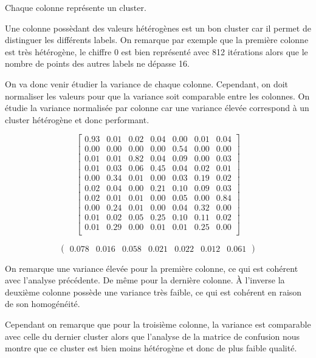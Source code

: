 \documentclass[french,a4paper,18pt]{article}
\begin{document}
Chaque colonne représente un cluster.

Une colonne possèdant des valeurs hétérogènes est un bon cluster car il permet de distinguer les différents labels.
On remarque par exemple que la première colonne est très hétérogène, le chiffre 0 est bien représenté avec 812 itérations
alors que le nombre de points des autres labels ne dépasse 16.

On va donc venir étudier la variance de chaque colonne. 
Cependant, on doit normaliser les valeurs pour que la variance soit comparable entre les colonnes.
On étudie la variance normalisée par colonne car une variance élevée correspond à un cluster hétérogène et donc performant.

\[
\begin{bmatrix}
    0.93 & 0.01 & 0.02 & 0.04 & 0.00 & 0.01 & 0.04 \\
    0.00 & 0.00 & 0.00 & 0.00 & 0.54 & 0.00 & 0.00 \\
    0.01 & 0.01 & 0.82 & 0.04 & 0.09 & 0.00 & 0.03 \\
    0.01 & 0.03 & 0.06 & 0.45 & 0.04 & 0.02 & 0.01 \\
    0.00 & 0.34 & 0.01 & 0.00 & 0.03 & 0.19 & 0.02 \\
    0.02 & 0.04 & 0.00 & 0.21 & 0.10 & 0.09 & 0.03 \\
    0.02 & 0.01 & 0.01 & 0.00 & 0.05 & 0.00 & 0.84 \\
    0.00 & 0.24 & 0.01 & 0.00 & 0.04 & 0.32 & 0.00 \\
    0.01 & 0.02 & 0.05 & 0.25 & 0.10 & 0.11 & 0.02 \\
    0.01 & 0.29 & 0.00 & 0.01 & 0.01 & 0.25 & 0.00 \\
\end{bmatrix}
\]

\[
\begin{pmatrix}
    0.078 & 0.016 & 0.058 & 0.021 & 0.022 & 0.012 & 0.061
\end{pmatrix}
\]

On remarque une variance élevée pour la première colonne, ce qui est cohérent avec l'analyse précédente.
De même pour la dernière colonne.
À l'inverse la deuxième colonne possède une variance très faible, ce qui est cohérent en raison 
de son homogénéité.

Cependant on remarque que pour la troisième colonne, la variance est comparable avec celle du dernier cluster
alors que l'analyse de la matrice de confusion nous montre que ce cluster est bien moins hétérogène et donc de plus faible qualité.
\end{document}
